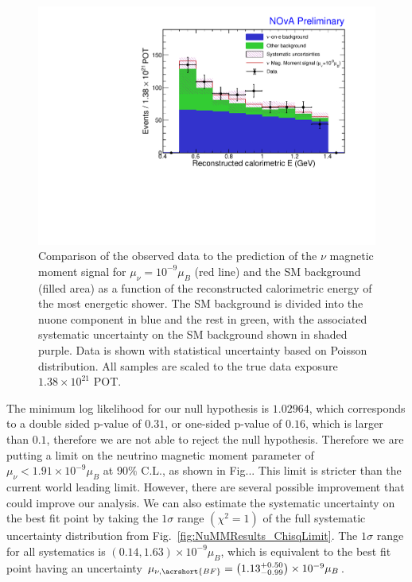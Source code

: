 \begin{figure}[hbtp]
\centering
\includegraphics[width=\textwidth]{Plots/NuMM/Stacked.pdf}
\caption[Final prediction and data comparison]{Comparison of the observed data to the prediction of the $\nu$ magnetic moment signal for $\mu_\nu=10^{-9}\mu_B$ (red line) and the \acrshort{SM} background (filled area) as a function of the reconstructed calorimetric energy of the most energetic shower. The \acrshort{SM} background is divided into the \acrshort{nuone} component in blue and the rest in green, with the associated systematic uncertainty on the \acrshort{SM} background shown in shaded purple. Data is shown with statistical uncertainty based on Poisson distribution. All samples are scaled to the true data exposure $1.38\times 10^{21}$ \acrshort{POT}.}
\label{fig:NuMMResults_Distribution}
\end{figure}



The minimum log likelihood for our null hypothesis is $1.02964$, which corresponds to a double sided p-value of $0.31$, or one-sided p-value of $0.16$, which is larger than $0.1$, therefore we are not able to reject the null hypothesis. Therefore we are putting a limit on the neutrino magnetic moment parameter of $\mu_\nu<1.91\times10^{-9}\mu_B$ at $90\%$ C.L., as shown in Fig... This limit is stricter than the current world leading limit. However, there are several possible improvement that could improve our analysis. We can also estimate the systematic uncertainty on the best fit point by taking the $1\sigma$ range $\left(\chi^2=1\right)$ of the full systematic uncertainty distribution from Fig.~\ref{fig:NuMMResults_ChisqLimit}. The $1\sigma$ range for all systematics is $\left(0.14,1.63\right)\times 10^{-9}\mu_B$, which is equivalent to the best fit point having an uncertainty $\mu_{\nu,\acrshort{BF}}=\left(1.13^{+0.50}_{-0.99}\right)\times 10^{-9}\mu_B$.

